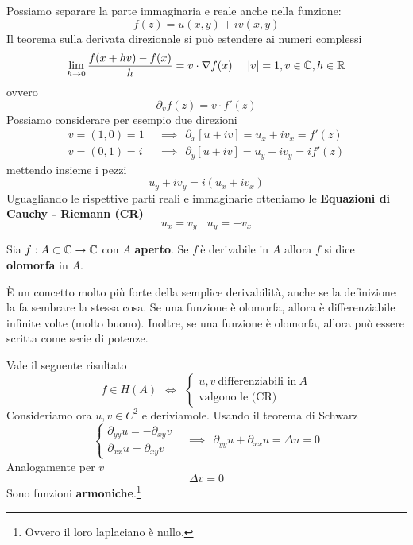 Possiamo separare la parte immaginaria e reale anche nella funzione:
\begin{equation*}
f(z) = u(x, y) + iv(x, y)
\end{equation*}
Il teorema sulla derivata direzionale si può estendere ai numeri complessi
\begin{equation*}
\lim_{h\rightarrow 0}\frac{f(x + hv) - f(x)}{h} = v\cdot \nabla f(x) \ \ \ \ | v| = 1, v\in \mathbb{C}, h\in \mathbb{R}
\end{equation*}
ovvero
\begin{equation*}
\partial_{v} f(z) = v\cdot f'(z)
\end{equation*}
Possiamo considerare per esempio due direzioni
\begin{equation*}
\begin{aligned}
v = (1, 0) = 1 & \ \ \implies \ \ \partial_{x}[u + iv] = u_{x} + iv_{x} = f'(z)\\
v = (0, 1) = i & \ \ \implies \ \ \partial_{y}[u + iv] = u_{y} + iv_{y} = if'(z)
\end{aligned}
\end{equation*}
mettendo insieme i pezzi
\begin{equation*}
u_{y} + iv_{y} = i(u_{x} + iv_{x})
\end{equation*}
Uguagliando le rispettive parti reali e immaginarie otteniamo le \textbf{Equazioni di Cauchy - Riemann (CR)}
\begin{equation*}
\boxed{u_{x} = v_{y}} \ \ \ \ \boxed{u_{y} = - v_{x}}
\end{equation*}
\begin{defn}
Sia $f: A\subset \mathbb{C}\rightarrow \mathbb{C}$ con $A$ \textbf{aperto}. Se $f\ $è derivabile in $A$ allora $f$ si dice \textbf{olomorfa} in $A$.
\end{defn}
È un concetto molto più forte della semplice derivabilità, anche se la definizione la fa sembrare la stessa cosa. Se una funzione è olomorfa, allora è differenziabile infinite volte (molto buono). Inoltre, se una funzione è olomorfa, allora può essere scritta come serie di potenze.

Vale il seguente risultato
\begin{equation*}
\boxed{f\in H(A) \ \ \iff \ \
\begin{cases}
u, v\ \text{differenziabili in} \ A\\
\text{valgono le (CR)}
\end{cases}}
\end{equation*}
Consideriamo ora $u, v\in C^{2}$ e deriviamole. Usando il teorema di Schwarz
\begin{equation*}
\begin{cases}
\partial_{yy} u = - \partial_{xy} v\ \ \ \ \\
\partial_{xx} u = \partial_{xy} v
\end{cases} \implies \ \ \partial_{yy} u + \partial_{xx} u = \Delta u = 0
\end{equation*}
Analogamente per $v$
\begin{equation*}
\Delta v = 0
\end{equation*}
Sono funzioni \textbf{armoniche}.\footnote{Ovvero il loro laplaciano è nullo.}

